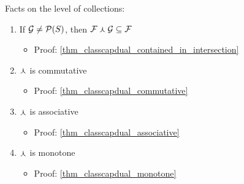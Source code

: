 \vskip0.5cm

Facts on the level of collections:
\begin{enumerate}
    \item {} If $\mathcal{G} \neq \mathcal{P}(S)$, then $\mathcal{F} \curlywedge \mathcal{G} \subseteq \mathcal{F}$
    \begin{itemize}
        \item Proof: \cref{thm_classcapdual_contained_in_intersection}
    \end{itemize}
    
    \item $\curlywedge$ is commutative
    \begin{itemize}
        \item Proof: \cref{thm_classcapdual_commutative}
    \end{itemize}
    
    \item $\curlywedge$ is associative
    \begin{itemize}
        \item Proof: \cref{thm_classcapdual_associative}
    \end{itemize}
    
    \item $\curlywedge$ is monotone
    \begin{itemize}
        \item Proof: \cref{thm_classcapdual_monotone}
    \end{itemize}
\end{enumerate}

\vskip0.5cm

